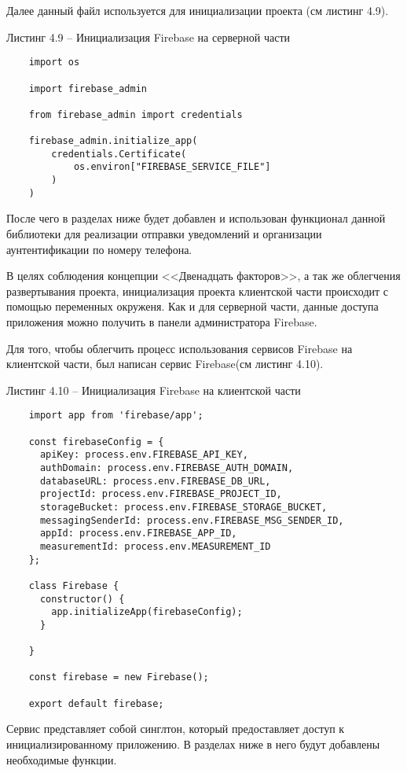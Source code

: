 Далее данный файл используется для инициализации проекта (см листинг 4.9).

Листинг 4.9 – Инициализация Firebase на серверной части
\begin{lstlisting}
    import os

    import firebase_admin

    from firebase_admin import credentials

    firebase_admin.initialize_app(
        credentials.Certificate(
            os.environ["FIREBASE_SERVICE_FILE"]
        )
    )
\end{lstlisting}

После чего в разделах ниже будет добавлен и использован функционал данной библиотеки для реализации отправки уведомлений и организации аунтентификации по номеру телефона.


В целях соблюдения концепции <<Двенадцать факторов>>, а так же облегчения развертывания проекта, инициализация проекта клиентской части происходит с помощью переменных окруженя.
Как и для серверной части, данные доступа приложения можно получить в панели администратора Firebase.

Для того, чтобы облегчить процесс использования сервисов Firebase на клиентской части, был написан сервис Firebase(см листинг 4.10).

Листинг 4.10 – Инициализация Firebase на клиентской части
\begin{lstlisting}
    import app from 'firebase/app';

    const firebaseConfig = {
      apiKey: process.env.FIREBASE_API_KEY,
      authDomain: process.env.FIREBASE_AUTH_DOMAIN,
      databaseURL: process.env.FIREBASE_DB_URL,
      projectId: process.env.FIREBASE_PROJECT_ID,
      storageBucket: process.env.FIREBASE_STORAGE_BUCKET,
      messagingSenderId: process.env.FIREBASE_MSG_SENDER_ID,
      appId: process.env.FIREBASE_APP_ID,
      measurementId: process.env.MEASUREMENT_ID
    };

    class Firebase {
      constructor() {
        app.initializeApp(firebaseConfig);
      }

    }

    const firebase = new Firebase();

    export default firebase;

\end{lstlisting}

Сервис представляет собой синглтон, который предоставляет доступ к инициализированному приложению.
В разделах ниже в него будут добавлены необходимые функции.


